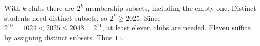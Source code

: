 With $k$ clubs there are $2^k$ membership subsets, including the empty one. Distinct students need distinct subsets, so $2^k\ge 2025$. Since $2^{10}=1024<2025\le 2048=2^{11}$, at least eleven clubs are needed. Eleven suffice by assigning distinct subsets. Thus $\boxed{11}$.

